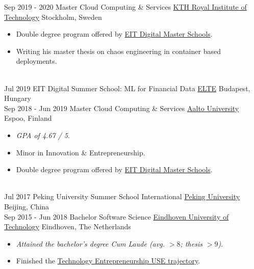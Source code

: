 \documentclass[a4paper]{twentysecondcv} %
\begin{document}
\begin{twenty} %
    \twentyitem
    	{Sep 2019 - }
        {2020}
        {Master Cloud Computing \& Services}
        {\href{https://kth.se/en}{KTH Royal Institute of Technology}}
        {Stockholm, Sweden}
        {
        \begin{itemize}
            \item Double degree program offered by \href{https://masterschool.eitdigital.eu/}{EIT Digital Master Schools}.
            \item Writing his master thesis on chaos engineering in container based deployments.
        \end{itemize}
        }
    \\
	\twentyitem
    	{Jul 2019}
		{}
        {EIT Digital Summer School: ML for Financial Data}
        {\href{https://www.elte.hu/en/}{ELTE}}
        {Budapest, Hungary}
        {
    	}
    \\
	\twentyitem
    	{Sep 2018 - }
        {Jun 2019}
        {Master Cloud Computing \& Services}
        {\href{https://www.aalto.fi/en}{Aalto University}}
        {Espoo, Finland}
        {
        \begin{itemize}
            \item \emph{GPA of 4.67 / 5}.
            \item Minor in Innovation \& Entrepreneurship.
            \item Double degree program offered by \href{https://masterschool.eitdigital.eu/}{EIT Digital Master Schools}.
        \end{itemize}
        }
    \\
	\twentyitem
    	{Jul 2017}
		{}
        {Peking University Summer School International}
        {\href{http://www.oir.pku.edu.cn/summerschool/}{Peking University}}
        {Beijing, China}
        {
    	}
    \\
    \twentyitem
    	{Sep 2015 - }
        {Jun 2018}
        {Bachelor Software Science}
        {\href{https://tue.nl/}{Eindhoven University of Technology}}
        {Eindhoven, The Netherlands}
        {
       	\begin{itemize}
   			\item \emph{Attained the bachelor's degree Cum Laude (avg. $> 8$; thesis $> 9$)}.
            \item Finished the \href{https://educationguide.tue.nl/programs/bachelor-college/use-learning-trajectory/technology-entrepreneurship/}{Technology Entrepreneurship USE trajectory}.
		\end{itemize}
    	}
\end{twenty}
\end{document}
